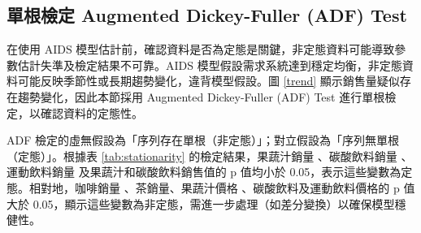 \subsection{單根檢定 Augmented Dickey-Fuller (ADF) Test}




在使用 AIDS 模型估計前，確認資料是否為定態是關鍵，非定態資料可能導致參數估計失準及檢定結果不可靠。AIDS 模型假設需求系統達到穩定均衡，非定態資料可能反映季節性或長期趨勢變化，違背模型假設。圖 \ref{trend} 顯示銷售量疑似存在趨勢變化，因此本節採用 Augmented Dickey-Fuller (ADF) Test 進行單根檢定，以確認資料的定態性。

ADF 檢定的虛無假設為「序列存在單根（非定態）」；對立假設為「序列無單根（定態）」。根據表 \ref{tab:stationarity} 的檢定結果，果蔬汁銷量
、碳酸飲料銷量
、運動飲料銷量%
及果蔬汁和碳酸飲料銷售值的 p 值均小於 0.05，表示這些變數為定態。相對地，咖啡銷量
、茶銷量、果蔬汁價格
、碳酸飲料及運動飲料價格的 p 值大於 0.05，顯示這些變數為非定態，需進一步處理（如差分變換）以確保模型穩健性。